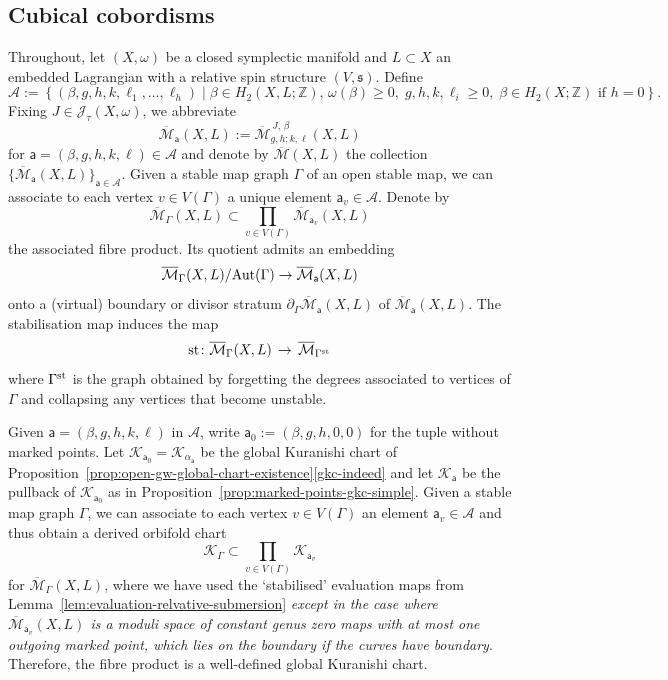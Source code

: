\documentclass[11pt,psamsfonts, oneside, reqno]{amsart}
\newcommand{\set}[1]{\left\{ #1 \right\}}
\newcommand{\sub}{\subset}%
\newcommand{\p}[2]{\prod\limits_{#1}{#2} }
\newcommand{\cl}{\colon}
\newcommand{\Mbar}{\overline{\mathcal M}}
\newcommand{\del}{\partial}
\newcommand{\Aut}{\normalfont\text{Aut}}
\newcommand{\bZ}{\mathbb{Z}}
\newcommand{\cA}{\mathcal{A}}
\newcommand{\cJ}{\mathcal{J}}
\newcommand{\cK}{\mathcal{K}}
\newcommand{\fs}{\mathfrak{s}}
\newcommand{\stb}{\normalfont\text{st}}
\theoremstyle{definition}
\theoremstyle{remark}
\numberwithin{equation}{section}
\begin{document}
\subsection{Cubical cobordisms}
 Throughout, let $(X,\omega)$ be a closed symplectic manifold and $L\sub X$ an embedded Lagrangian with a relative spin structure $(V,\fs)$. Define 
\begin{equation*}\label{} 
	\cA := \set{(\beta,g,h,k,\ell_1,\dots,\ell_h)\mid\beta \in H_2(X,L;\bZ),\,\omega(\beta) \geq0,\; g,h,k,\ell_i \geq 0,\;\beta\in H_2(X;\bZ)\text{ if }h = 0}.
\end{equation*}
Fixing $J \in \cJ_\tau(X,\omega)$, we abbreviate 
$$\Mbar_{\mathsf{a}}(X,L) := \Mbar_{g,h;k,\ell}^{\,J,\,\beta}(X,L)$$\noindent 
for $\mathsf{a} = (\beta,g,h,k,\ell)\in \cA$ and denote by $\Mbar(X,L)$ the collection $\{\Mbar_{\mathsf{a}}(X,L)\}_{\mathsf{a}\in \cA}$.
Given a stable map graph $\Gamma$ of an open stable map, we can associate to each vertex $v \in V(\Gamma)$ a unique element $\mathsf{a}_v \in \cA$. Denote by 
$$\Mbar_{\Gamma}(X,L)\sub \p{v \in V(\Gamma)}{\Mbar_{\mathsf{a}_v}(X,L)}$$ \noindent
the associated fibre product. Its quotient admits an embedding 
\begin{equation}\label{eq:embedding-of-fibre-product}\Mbar_{\Gamma}(X,L)/\Aut(\Gamma)\to \Mbar_{\mathsf{a}}(X,L) \end{equation}
onto a (virtual) boundary or divisor stratum $\del_\Gamma\Mbar_{\mathsf{a}}(X,L)$ of $\Mbar_{\mathsf{a}}(X,L)$. The stabilisation map induces the map
\begin{equation}\label{} \stb \cl \Mbar_\Gamma(X,L)\,\to \,\Mbar_{\Gamma^{\stb}}\end{equation}
where $\Gamma^{\stb}$ is the graph obtained by forgetting the degrees associated to vertices of $\Gamma$ and collapsing any vertices that become unstable.\par
Given $\mathsf{a} = (\beta,g,h,k,\ell)$ in $\cA$, write $\mathsf{a}_0 := (\beta,g,h,0,0)$ for the tuple without marked points. Let $\cK_{\mathsf{a}_0} = \cK_{\alpha_{\mathsf{a}}}$ be the global Kuranishi chart of Proposition~\ref{prop:open-gw-global-chart-existence}\eqref{gkc-indeed} and let $\cK_{\mathsf{a}}$ be the pullback of $\cK_{\mathsf{a}_0}$ as in Proposition~\ref{prop:marked-points-gkc-simple}. Given a stable map graph $\Gamma$, we can associate to each vertex $v \in V(\Gamma)$ an element $\mathsf{a}_v\in \cA$ and thus obtain a derived orbifold chart 
\begin{equation}\label{eq:graph-gkc}\cK_\Gamma \sub \p{v\in V(\Gamma)}{\cK_{\mathsf{a}_v}}\end{equation}
for $\Mbar_\Gamma(X,L)$, where we have used the `stabilised' evaluation maps from Lemma~\ref{lem:evaluation-relvative-submersion} \emph{except in the case where $\Mbar_{\mathsf{a}_v}(X,L)$ is a moduli space of constant genus zero maps with at most one outgoing marked point, which lies on the boundary if the curves have boundary}. Therefore, the fibre product is a well-defined global Kuranishi chart.
\end{document}
